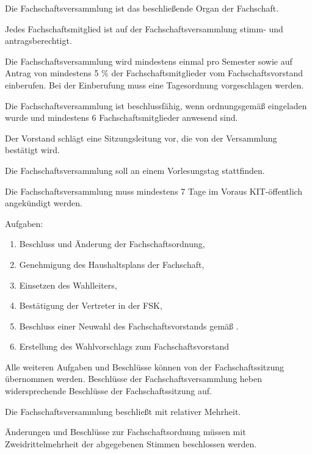 \documentclass[a4paper, parskip=half, numbers=noenddot]{scrartcl}
\begin{document}
\begin{contract}
%
%

%
\label{fachschaft:vv}

Die Fachschaftsversammlung ist das beschließende Organ der Fachschaft.

Jedes Fachschaftsmitglied ist auf der Fachschaftsversammlung stimm- und antragsberechtigt.

Die Fachschaftsversammlung wird mindestens einmal pro Semester sowie auf Antrag von mindestens 5 \% der Fachschaftsmitglieder vom Fachschaftsvorstand einberufen. Bei der Einberufung muss eine Tagesordnung vorgeschlagen werden.

Die Fachschaftsversammlung ist beschlussfähig, wenn ordnungsgemäß eingeladen wurde und mindestens 6 Fachschaftsmitglieder anwesend sind.

Der Vorstand schlägt eine Sitzungsleitung vor, die von der Versammlung bestätigt wird.

Die Fachschaftsversammlung soll an einem Vorlesungstag stattfinden.

Die Fachschaftsversammlung muss mindestens 7 Tage im Voraus KIT-\"offentlich angekündigt werden.

Aufgaben: \label{fachschaft:vv:kompetenzen}
  \begin{enumerate}
  \item Beschluss und Änderung der Fachschaftsordnung,
  \item Genehmigung des Haushaltsplans der Fachschaft,
  \item Einsetzen des Wahlleiters, \label{fachschaft:vv:wahlleiter}
  \item Bestätigung der Vertreter in der FSK,
  \item Beschluss einer Neuwahl des Fachschaftsvorstands gemäß 
. \label{fachschaft:vv:kompetenzen:abwahl}
  \item Erstellung des Wahlvorschlags zum Fachschaftsvorstand
  \end{enumerate}

Alle weiteren Aufgaben und Beschlüsse können von der Fachschaftssitzung übernommen werden. Beschlüsse der Fachschaftsversammlung heben widersprechende Beschlüsse der Fachschaftssitzung auf.

Die Fachschaftsversammlung beschließt mit relativer Mehrheit.

Änderungen und Beschlüsse zur Fachschaftsordnung müssen mit Zweidrittelmehrheit der abgegebenen Stimmen beschlossen werden.


\end{contract}
\end{document}
